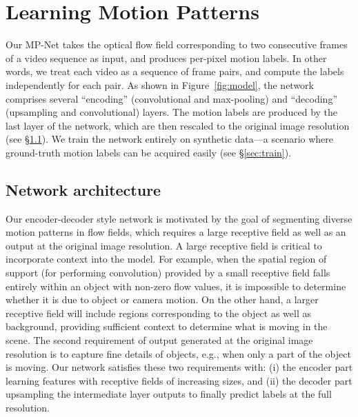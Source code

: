 \documentclass[10pt,twocolumn,letterpaper]{article}
\begin{document}
\section{Learning Motion Patterns}
\label{sec:model}
\vspace{-0.05cm}
Our MP-Net takes the optical flow field corresponding to two consecutive frames
of a video sequence as input, and produces per-pixel motion labels. In other
words, we treat each video as a sequence of frame pairs, and compute the labels
independently for each pair. As shown in Figure~\ref{fig:model}, the network
comprises several ``encoding'' (convolutional and max-pooling) and ``decoding''
(upsampling and convolutional) layers. The motion labels are produced by the
last layer of the network, which are then rescaled to the original image
resolution (see \S\ref{sec:net}). We train the network entirely on synthetic
data---a scenario where ground-truth motion labels can be acquired easily (see
\S\ref{sec:train}).

\subsection{Network architecture}
\label{sec:net}
\vspace{-0.05cm}
Our encoder-decoder style network is motivated by the goal of segmenting
diverse motion patterns in flow fields, which requires a large receptive field
as well as an output at the original image resolution. A large receptive field
is critical to incorporate context into the model. For example, when the
spatial region of support (for performing convolution) provided by a small
receptive field falls entirely within an object with non-zero flow values, it
is impossible to determine whether it is due to object or camera motion. On the
other hand, a larger receptive field will include regions corresponding to the
object as well as background, providing sufficient context to determine what is
moving in the scene. The second requirement of output generated at the original
image resolution is to capture fine details of objects, e.g., when only a part
of the object is moving. Our network satisfies these two requirements with: (i)
the encoder part learning features with receptive fields of increasing sizes,
and (ii) the decoder part upsampling the intermediate layer outputs to finally
predict labels at the full resolution.
\end{document}
